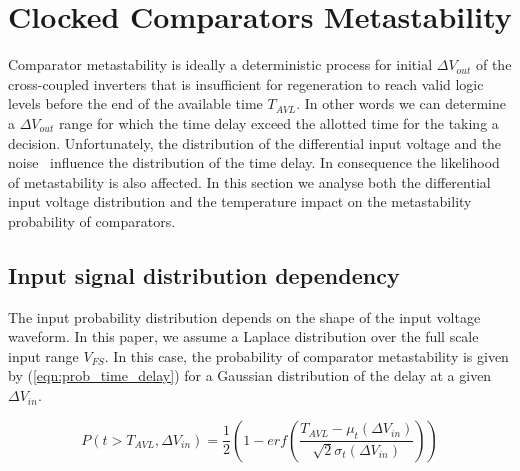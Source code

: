 
\chapter{Clocked Comparators Metastability}
\label{app:comp-metastability}

Comparator metastability is ideally a deterministic process for initial $\Delta V_{out}$ of the cross-coupled inverters that is insufficient for regeneration to reach valid logic levels before the end of the available time $T_{AVL}$. In other words we can determine a $\Delta V_{out}$ range for which the time delay exceed the allotted time for the taking a decision.
  Unfortunately, the distribution of the differential input voltage and the noise~\cite{noise_comp_sepke_2009} influence the distribution of the time delay. In consequence the likelihood of metastability is also affected. In this section we analyse both the differential input voltage distribution and the temperature impact on the metastability probability of comparators.

\section{Input signal distribution dependency}
The input probability distribution depends on the shape of the input voltage waveform. In this paper, we assume a Laplace distribution over the full scale input range $V_{FS}$. In this case, the probability of comparator metastability is given by (\ref{eqn:prob_time_delay}) for a Gaussian distribution of the delay at a given $\Delta V_{in}$.


\begin{equation}
P(t > T_{AVL}, \Delta V_{in}) = \frac{1}{2}\left(1-erf\left(\frac{T_{AVL}-\mu_{t}(\Delta V_{in})}{\sqrt{2}\sigma_{t}(\Delta V_{in})}\right)\right)
\label{eqn:prob_time_delay}
\end{equation}


